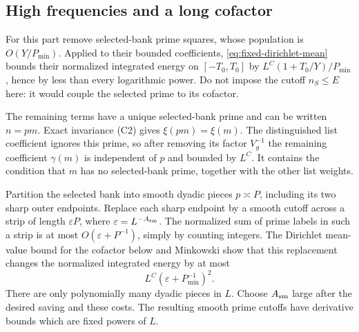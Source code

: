 \subsection{High frequencies and a long cofactor}

For this part remove selected-bank prime squares, whose population
is \(O(Y/P_{\min})\). Applied to their bounded coefficients,
\eqref{eq:fixed-dirichlet-mean} bounds their normalized integrated
energy on \([-T_0,T_0]\) by
\(L^C(1+T_0/Y)/P_{\min}\), hence by less than every logarithmic
power. Do not impose the cutoff \(n_S\le E\) here: it would
couple the selected prime to its cofactor.

The remaining terms have a unique selected-bank prime and can be
written \(n=pm\). Exact invariance \textup{(C2)} gives
\(\xi(pm)=\xi(m)\). The distinguished list coefficient ignores
this prime, so after removing its factor \(V_g^{-1}\) the
remaining coefficient \(\gamma(m)\) is independent of \(p\) and
bounded by \(L^C\). It contains the condition that \(m\) has no
selected-bank prime, together with the other list weights.

Partition the selected bank into smooth dyadic pieces
\(p\asymp P\), including its two sharp outer endpoints. Replace
each sharp endpoint by a smooth cutoff across a strip of length
\(\varepsilon P\), where \(\varepsilon=L^{-A_{\rm sm}}\).
The normalized sum of prime labels in such a strip is at most
\(O(\varepsilon+P^{-1})\), simply by counting integers. The
Dirichlet mean-value bound for the cofactor below and Minkowski
show that this replacement changes the normalized integrated
energy by at most
\[
                  L^C(\varepsilon+P_{\min}^{-1})^2.
\]
There are only polynomially many dyadic pieces in \(L\).
Choose \(A_{\rm sm}\) large after the desired saving and these
costs. The resulting smooth prime cutoffs have derivative bounds
which are fixed powers of \(L\).

